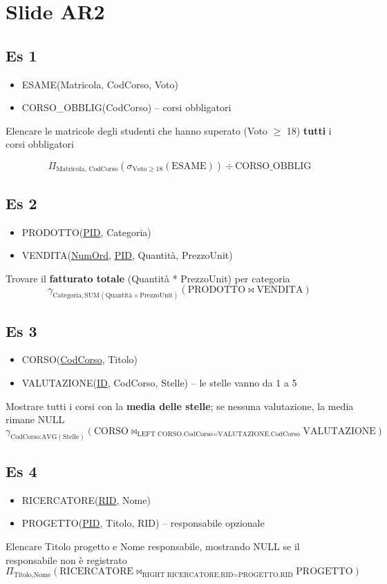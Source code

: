 \newpage
\section{Slide AR2}
\subsection{Es 1}
\begin{itemize}
    \item ESAME(Matricola, CodCorso, Voto)
    \item CORSO\_OBBLIG(CodCorso) \quad -- corsi obbligatori
\end{itemize}
Elencare le matricole degli studenti che hanno superato (Voto $\geq$ 18) \textbf{tutti} i corsi obbligatori

\[
\Pi_{\text{Matricola, CodCorso}} (\sigma_{\text{Voto} \geq 18}(\text{ESAME})) \div \text{CORSO\_OBBLIG}
\]

\subsection{Es 2}
\begin{itemize}
    \item PRODOTTO(\underline{PID}, Categoria)
    \item VENDITA(\underline{NumOrd}, \underline{PID}, Quantit\`a, PrezzoUnit)
\end{itemize}
Trovare il \textbf{fatturato totale} (Quantit\`a * PrezzoUnit) per categoria
\[
\gamma_{\text{Categoria}, \text{SUM}(\text{Quantit\`a} \times \text{PrezzoUnit})} (\text{PRODOTTO} \bowtie \text{VENDITA})
\]

\subsection{Es 3}
\begin{itemize}
    \item CORSO(\underline{CodCorso}, Titolo)
    \item VALUTAZIONE(\underline{ID}, CodCorso, Stelle) \quad -- le stelle vanno da 1 a 5
\end{itemize}
Mostrare tutti i corsi con la \textbf{media delle stelle}; se nessuna valutazione, la media rimane NULL
\[
\gamma_{\text{CodCorso:} \text{AVG}(\text{Stelle})} (\text{CORSO} \bowtie_{\text{LEFT } \text{CORSO.CodCorso} = \text{VALUTAZIONE.CodCorso}} \text{VALUTAZIONE})
\]

\subsection{Es 4}
\begin{itemize}
    \item RICERCATORE(\underline{RID}, Nome)
    \item PROGETTO(\underline{PID}, Titolo, RID) \quad -- responsabile opzionale
\end{itemize}
Elencare Titolo progetto e Nome responsabile, mostrando NULL se il responsabile non \`e registrato
\[
\Pi_{\text{Titolo}, \text{Nome}} (\text{RICERCATORE} \bowtie_{\text{RIGHT } \text{RICERCATORE.RID} = \text{PROGETTO.RID}} \text{PROGETTO})
\]

